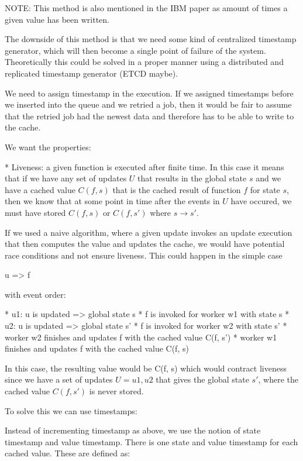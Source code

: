 NOTE: This method is also mentioned in the IBM paper as amount of times a given
value has been written.

The downside of this method is that we need some kind of centralized timestamp
generator, which will then become a single point of failure of the system.
Theoretically this could be solved in a proper manner using a distributed
and replicated timestamp generator (ETCD maybe).

We need to assign timestamp in the execution. If we assigned timestamps before
we inserted into the queue and we retried a job, then it would be fair to
assume that the retried job had the newest data and therefore has to be able
to write to the cache.



We want the properties:

* Liveness: a given function is executed after finite time. In this case it
  means that if we have any set of updates $U$ that results in the global state
  $s$ and we have a cached value $C(f, s)$ that is the cached result
  of function $f$ for state $s$, then we know that at some point in time after
  the events in $U$ have occured, we must have stored $C(f, s)$ or $C(f, s')$
  where $s \rightarrow s'$.

If we used a naive algorithm, where a given update invokes an update execution
that then computes the value and updates the cache, we would have potential
race conditions and not ensure liveness. This could happen in the simple case

u => f

with event order:

* u1: u is updated => global state s
* f is invoked for worker w1 with state s
* u2: u is updated => global state s'
* f is invoked for worker w2 with state s'
* worker w2 finishes and updates f with the cached value C(f, s')
* worker w1 finishes and updates f with the cached value C(f, s)

In this case, the resulting value would be C(f, s) which would contract
liveness since we have a set of updates $U = {u1, u2}$ that gives the global
state $s'$, where the cached value $C(f, s')$ is never stored.

To solve this we can use timestamps:

Instead of incrementing timestamp as above, we use the notion of state timestamp
and value timestamp. There is one state and value timestamp for each cached
value. These are defined as:

